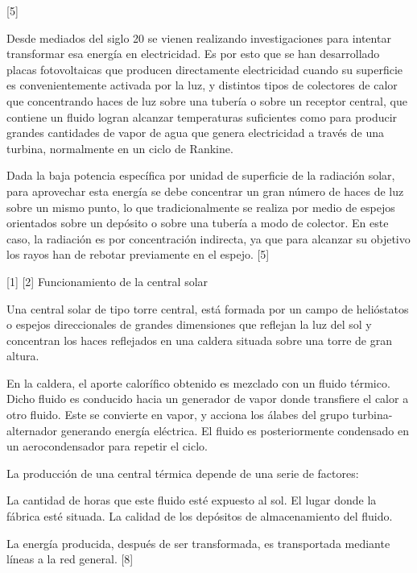 \documentclass[12pt]{article}
\begin{document}
[5]

Desde mediados del siglo 20 se vienen realizando investigaciones para intentar transformar esa energía en electricidad. Es por esto que se han desarrollado placas fotovoltaicas que producen directamente electricidad cuando su superficie es convenientemente activada por la luz, y distintos tipos de colectores de calor que concentrando haces de luz sobre una tubería o sobre un receptor central, que contiene un fluido logran alcanzar temperaturas suficientes como para producir grandes cantidades de vapor de agua que genera electricidad a través de una turbina, normalmente en un ciclo de Rankine.

Dada la baja potencia específica por unidad de superficie de la radiación solar, para aprovechar esta energía se debe concentrar un gran número de haces de luz sobre un mismo punto, lo que tradicionalmente se realiza por medio de espejos orientados sobre un depósito o sobre una tubería a modo de colector. En este caso, la radiación es por concentración indirecta, ya que para alcanzar su objetivo los rayos han de rebotar previamente en el espejo. [5]

[1] [2]
Funcionamiento de la central solar

Una central solar de tipo torre central, está formada por un campo de helióstatos o espejos direccionales de grandes dimensiones que reflejan la luz del sol y concentran los haces reflejados en una caldera situada sobre una torre de gran altura.



En la caldera, el aporte calorífico obtenido es mezclado con un fluido térmico. Dicho fluido es conducido hacia un generador de vapor donde transfiere el calor a otro fluido. Este se convierte en vapor, y acciona los álabes del grupo turbina-alternador generando energía eléctrica. El fluido es posteriormente condensado en un aerocondensador para repetir el ciclo.

La producción de una central térmica depende de una serie de factores:

La cantidad de horas que este fluido esté expuesto al sol.
El lugar donde la fábrica esté situada.
La calidad de los depósitos de almacenamiento del fluido.

La energía producida, después de ser transformada, es transportada mediante líneas a la red general. [8]
\end{document}

